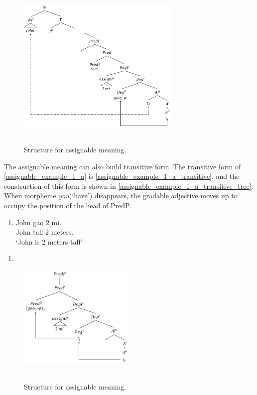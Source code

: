 \documentclass{ctexart}
\begin{document}
\begin{figure}[H]
    \centering
    \includegraphics[width=0.7\textwidth]{pic/assignment_meaning.png}
    \begin{caption}
        \\ \vspace{-1.1ex}
        Structure for assignable meaning.
    \end{caption}
\end{figure}

The assignable meaning can also build transitive form. The transitive form of \ref{assignable_example_1_a} is \ref{assignable_example_1_a_transitive}, and the construction of this form is shown in \ref{assignable_example_1_a_transitive_tree}. When morpheme \textit{you}(`have') disappears, the gradable adjective moves up to occupy the position of the head of PredP.

\begin{enumerate}
    \item \label{assignable_example_1_a_transitive}
    John gao 2 mi. \\
    John tall 2 meters. \\
    `John is 2 meters tall'
\end{enumerate}

\begin{enumerate}
    \item \label{assignable_example_1_a_transitive_tree}
\end{enumerate}

\begin{figure}[H]
    \centering
    \includegraphics[width=0.5\textwidth]{pic/assignment_meaning_transitive.png}
    \begin{caption}
        \\ \vspace{-1.1ex}
        Structure for assignable meaning.
    \end{caption}
\end{figure}
\end{document}
